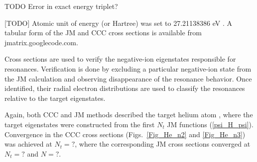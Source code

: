 \documentclass[aip
, pra
, showpacs
, aps
, twocolumn
, groupedaddress
, floatfix
]{revtex4}
\begin{document}
TODO Error in exact energy triplet?

[TODO]
Atomic unit of energy (or Hartree) was set to 27.21138386 eV \cite{MTN08}. A tabular
form of the JM and CCC cross sections is available from jmatrix.googlecode.com.


Cross sections are used to verify the negative-ion eigenstates responsible for resonances.
Verification is done by excluding a particular negative-ion state from the JM calculation and observing disappearance of the resonance behavior.
Once identified, their radial electron distributions are used to classify the resonances relative to the target eigenstates.






Again, both CCC and JM methods described the target helium atom
, where the target eigenstates were constructed from the first $N_t$ JM functions (\ref{psi_H_psi}). Convergence in the CCC cross sections
(Figs.~\ref{Fig_He_n2} and \ref{Fig_He_n3}) was achieved at $N_t=?$, where the corresponding JM cross sections
converged at $N_t=?$ and $N=?$.
\end{document}
